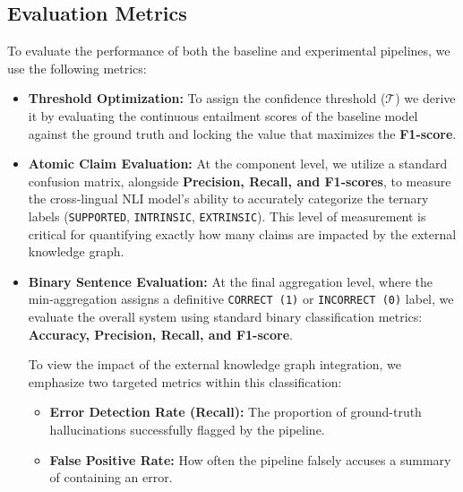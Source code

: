 \subsection{Evaluation Metrics}
To evaluate the performance of both the baseline and experimental pipelines, we use the following metrics: 
\begin{itemize}
    \item \textbf{Threshold Optimization:} To assign the confidence threshold ($\mathcal{T}$) we derive it by evaluating the continuous entailment scores of the baseline model against the ground truth and locking the value that maximizes the \textbf{F1-score}.
    
    \item \textbf{Atomic Claim Evaluation:} At the component level, we utilize a standard confusion matrix, alongside \textbf{Precision, Recall, and F1-scores}, to measure the cross-lingual NLI model's ability to accurately categorize the ternary labels (\texttt{SUPPORTED}, \texttt{INTRINSIC}, \texttt{EXTRINSIC}). This level of measurement is critical for quantifying exactly how many claims are impacted by the external knowledge graph.
    
    \item \textbf{Binary Sentence Evaluation:} At the final aggregation level, where the min-aggregation assigns a definitive \texttt{CORRECT (1)} or \texttt{INCORRECT (0)} label, we evaluate the overall system using standard binary classification metrics: \textbf{Accuracy, Precision, Recall, and F1-score}. 
    
     To view the impact of the external knowledge graph integration, we emphasize two targeted metrics within this classification:
    \begin{itemize}
        \item \textbf{Error Detection Rate (Recall):} The proportion of ground-truth hallucinations successfully flagged by the pipeline.
        \item \textbf{False Positive Rate:} How often the pipeline falsely accuses a summary of containing an error. 
    \end{itemize}
\end{itemize}
